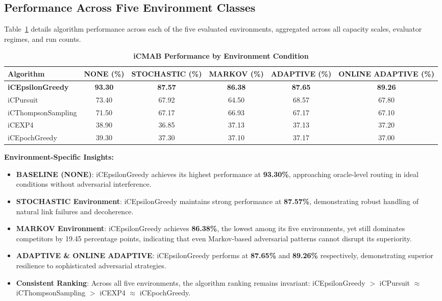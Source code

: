 \documentclass[12pt,a4paper]{article}
\newcommand{\performance}[1]{\textcolor{performancecolor}{\textbf{#1}}}
\newcommand{\stochastic}[1]{\textcolor{stochasticcolor}{\textbf{#1}}}
\begin{document}
\begin{tcolorbox}[colback=stochasticcolor!10,colframe=stochasticcolor,title=\textbf{Environment-Wise Performance Analysis}]

\subsection{Performance Across Five Environment Classes}

Table~\ref{tab:env-performance} details algorithm performance across each of the five evaluated environments, aggregated across all capacity scales, evaluator regimes, and run counts.

\begin{table}[H]
\centering
\caption{\stochastic{iCMAB Performance by Environment Condition}}
\label{tab:env-performance}
\begin{tabular}{|l|c|c|c|c|c|}
\hline
\textbf{Algorithm} & \textbf{NONE (\%)} & \textbf{STOCHASTIC (\%)} & \textbf{MARKOV (\%)} & \textbf{ADAPTIVE (\%)} & \textbf{ONLINE ADAPTIVE (\%)} \\
\hline
\hline
\performance{iCEpsilonGreedy} & \performance{93.30} & \performance{87.57} & \performance{86.38} & \performance{87.65} & \performance{89.26} \\
iCPursuit & 73.40 & 67.92 & 64.50 & 68.57 & 67.80 \\
iCThompsonSampling & 71.50 & 67.17 & 66.93 & 67.17 & 67.10 \\
iCEXP4 & 38.90 & 36.85 & 37.13 & 37.13 & 37.20 \\
iCEpochGreedy & 39.30 & 37.30 & 37.10 & 37.17 & 37.00 \\
\hline
\end{tabular}
\end{table}

\textbf{Environment-Specific Insights:}

\begin{itemize}
\item \stochastic{BASELINE (NONE)}: iCEpsilonGreedy achieves its highest performance at \textbf{93.30\%}, approaching oracle-level routing in ideal conditions without adversarial interference.
\item \stochastic{STOCHASTIC Environment}: iCEpsilonGreedy maintains strong performance at \textbf{87.57\%}, demonstrating robust handling of natural link failures and decoherence.
\item \stochastic{MARKOV Environment}: iCEpsilonGreedy achieves \textbf{86.38\%}, the lowest among its five environments, yet still dominates competitors by 19.45 percentage points, indicating that even Markov-based adversarial patterns cannot disrupt its superiority.
\item \stochastic{ADAPTIVE \& ONLINE ADAPTIVE}: iCEpsilonGreedy performs at \textbf{87.65\%} and \textbf{89.26\%} respectively, demonstrating superior resilience to sophisticated adversarial strategies.
\item \stochastic{Consistent Ranking}: Across all five environments, the algorithm ranking remains invariant: iCEpsilonGreedy $>$ iCPursuit $\approx$ iCThompsonSampling $>$ iCEXP4 $\approx$ iCEpochGreedy.
\end{itemize}


\end{tcolorbox}
\end{document}
